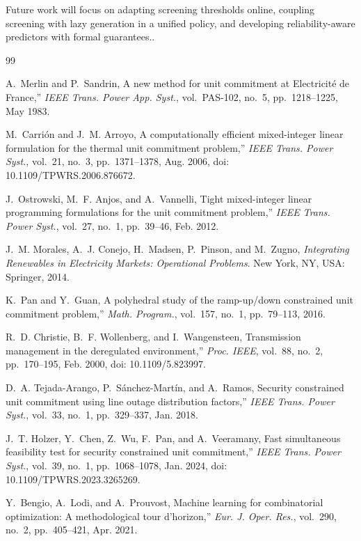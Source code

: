 \documentclass{ieeeaccess}
\begin{document}
Future work will focus on adapting screening thresholds online, coupling screening with lazy generation in a unified policy, and developing reliability-aware predictors with formal guarantees..




\begin{thebibliography}{99}

A.~Merlin and P.~Sandrin, A new method for unit commitment at Electricité de France,'' \emph{IEEE Trans. Power App. Syst.}, vol.~PAS-102, no.~5, pp.~1218--1225, May 1983. 

 M.~Carrión and J.~M. Arroyo, A computationally efficient mixed-integer linear formulation for the thermal unit commitment problem,'' \emph{IEEE Trans. Power Syst.}, vol.~21, no.~3, pp.~1371--1378, Aug. 2006, doi: 10.1109/TPWRS.2006.876672.

J.~Ostrowski, M.~F. Anjos, and A.~Vannelli, Tight mixed-integer linear programming formulations for the unit commitment problem,'' \emph{IEEE Trans. Power Syst.}, vol.~27, no.~1, pp.~39--46, Feb. 2012. 

 J.~M. Morales, A.~J. Conejo, H.~Madsen, P.~Pinson, and M.~Zugno, \emph{Integrating Renewables in Electricity Markets: Operational Problems}. New York, NY, USA: Springer, 2014. 

 K.~Pan and Y.~Guan, A polyhedral study of the ramp-up/down constrained unit commitment problem,'' \emph{Math. Program.}, vol.~157, no.~1, pp.~79--113, 2016.

R.~D. Christie, B.~F. Wollenberg, and I.~Wangensteen, Transmission management in the deregulated environment,'' \emph{Proc. IEEE}, vol.~88, no.~2, pp.~170--195, Feb. 2000, doi: 10.1109/5.823997. 

 D.~A. Tejada-Arango, P.~Sánchez-Martín, and A.~Ramos, Security constrained unit commitment using line outage distribution factors,'' \emph{IEEE Trans. Power Syst.}, vol.~33, no.~1, pp.~329--337, Jan. 2018.

 J.~T. Holzer, Y.~Chen, Z.~Wu, F.~Pan, and A.~Veeramany, Fast simultaneous feasibility test for security constrained unit commitment,'' \emph{IEEE Trans. Power Syst.}, vol.~39, no.~1, pp.~1068--1078, Jan. 2024, doi: 10.1109/TPWRS.2023.3265269.


Y.~Bengio, A.~Lodi, and A.~Prouvost, Machine learning for combinatorial optimization: A methodological tour d'horizon,'' \emph{Eur. J. Oper. Res.}, vol.~290, no.~2, pp.~405--421, Apr. 2021. 


\end{thebibliography}
\end{document}
